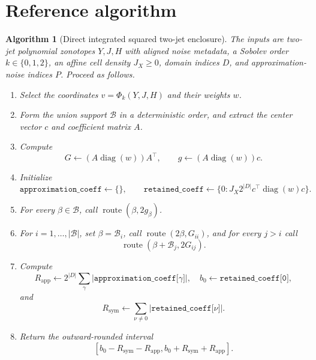 \documentclass[11pt]{article}
\newtheorem{algorithmblock}{Algorithm}
\newcommand{\abs}[1]{\left\lvert #1\right\rvert}
\newcommand{\diag}{\operatorname{diag}}
\begin{document}
\section{Reference algorithm}

\begin{algorithmblock}[Direct integrated squared two-jet enclosure]
\label{alg:direct}
The inputs are two-jet polynomial zonotopes \(Y,J,H\) with aligned noise
metadata, a Sobolev order \(k\in\{0,1,2\}\), an affine cell density
\(J_X\geq0\), domain indices \(D\), and approximation-noise indices \(P\).
Proceed as follows.
\begin{enumerate}[label=\arabic*.,leftmargin=1.8em]
    \item Select the coordinates \(v=\Phi_k(Y,J,H)\) and their weights \(w\).
    \item Form the union support \(\mathcal{B}\) in a deterministic order,
    and extract the center vector \(c\) and coefficient matrix \(A\).
    \item Compute
    \[
        G\gets(A\diag(w))A^\top,\qquad
        g\gets(A\diag(w))c.
    \]
    \item Initialize
    \[
        \texttt{approximation\_coeff}\gets\{\},\qquad
        \texttt{retained\_coeff}
        \gets\{0:J_X 2^{\abs D}c^\top\diag(w)c\}.
    \]
    \item For every \(\beta\in\mathcal{B}\), call
    \(\operatorname{route}(\beta,2g_\beta)\).
    \item For \(i=1,\ldots,\abs{\mathcal{B}}\), set
    \(\beta=\mathcal{B}_i\), call
    \(\operatorname{route}(2\beta,G_{ii})\), and for every \(j>i\) call
    \[
        \operatorname{route}(\beta+\mathcal{B}_j,2G_{ij}).
    \]
    \item Compute
    \[
        R_{\mathrm{app}}
        \gets2^{\abs D}\sum_\gamma
        \abs{\texttt{approximation\_coeff[\(\gamma\)]}},
        \quad
        b_0\gets\texttt{retained\_coeff[0]},
    \]
    and
    \[
        R_{\mathrm{sym}}
        \gets\sum_{\nu\neq0}
        \abs{\texttt{retained\_coeff[\(\nu\)]}}.
    \]
    \item Return the outward-rounded interval
    \[
        [b_0-R_{\mathrm{sym}}-R_{\mathrm{app}},
         b_0+R_{\mathrm{sym}}+R_{\mathrm{app}}].
    \]
\end{enumerate}
\end{algorithmblock}
\end{document}
